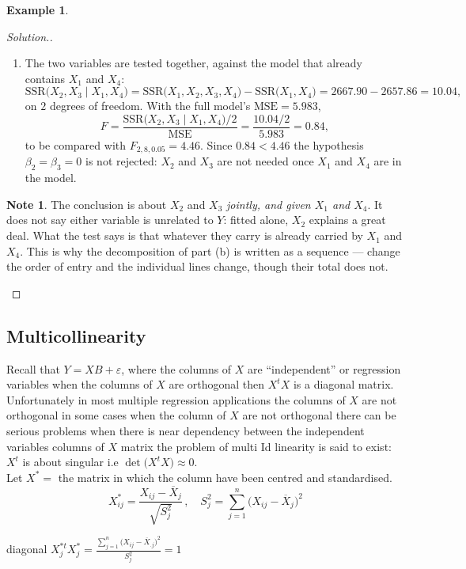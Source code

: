 \documentclass[11pt,a4paper]{article}
\theoremstyle{definition}
\newtheorem{exa}[thm]{Example}
\newtheorem*{note}{Note}
\newenvironment{solution}
  {\renewcommand{\qedsymbol}{}\begin{proof}[\textit{Solution}.]}
  {\end{proof}}
\begin{document}
\begin{exa}
\begin{enumerate}
\begin{solution}
\begin{enumerate}
\item The two variables are tested together, against the model that already
contains $X_1$ and $X_4$:
$$\text{SSR}\big(X_2,X_3\mid X_1,X_4\big)
=\text{SSR}\big(X_1,X_2,X_3,X_4\big)-\text{SSR}\big(X_1,X_4\big)
=2667.90-2657.86=10.04,$$
on $2$ degrees of freedom. With the full model's $\text{MSE}=5.983$,
$$F=\frac{\text{SSR}\big(X_2,X_3\mid X_1,X_4\big)/2}{\text{MSE}}
=\frac{10.04/2}{5.983}=0.84,$$
to be compared with $F_{2,8,0.05}=4.46$. Since $0.84<4.46$ the hypothesis
$\beta_2=\beta_3=0$ is not rejected: $X_2$ and $X_3$ are not needed once $X_1$
and $X_4$ are in the model.
\end{enumerate}

\begin{note}
The conclusion is about $X_2$ and $X_3$ \emph{jointly, and given $X_1$ and
$X_4$}. It does not say either variable is unrelated to $Y$: fitted alone,
$X_2$ explains a great deal. What the test says is that whatever they carry is
already carried by $X_1$ and $X_4$. This is why the decomposition of part (b)
is written as a sequence --- change the order of entry and the individual
lines change, though their total does not.
\end{note}
\end{solution}
\end{enumerate}
\end{exa}


\subsection{Multicollinearity}
Recall that $Y=XB+\varepsilon$, where the columns of $X$ are ``independent'' or regression variables when the columns of $X$ are orthogonal then $X^tX$ is a diagonal matrix. Unfortunately in most multiple regression applications the columns of $X$ are not orthogonal in some cases when the column of $X$ are not orthogonal there can be serious problems when there is near dependency between the independent variables columns of $X$ matrix the problem of multi Id linearity is said to exist: $X^t$ is about singular i.e $\det\big(X^tX\big)\approx 0$.\\

Let $X^*=$ the matrix in which the column have been centred and standardised.
$$X^*_{ij}=\frac{X_{ij}-\overline{X}_j}{\sqrt{S^2_j}}\,,  \quad  S^2_j=\sum^n_{j=1}\big(X_{ij}-\overline{X}_j\big)^2$$

diagonal $X_j^{*t}X^{*}_j=\frac{\sum\limits^n_{j=1}\big(X_{ij}-\overline{X}_{. j}\big)^2}{S^2_j}=1$ \\
\end{document}
